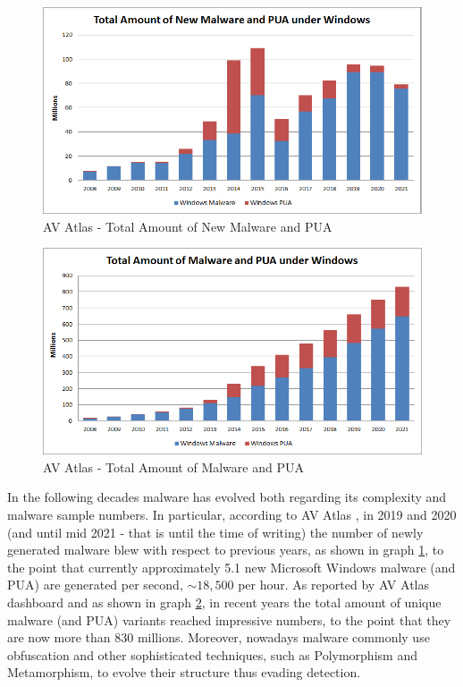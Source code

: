\documentclass[pdfa%
,cucitura%
]{toptesi}
\begin{document}
\begin{figure}[h!]
	\centering
	\includegraphics[width=\textwidth]{./images/av_atlas_report_total_amount_new.png}
	\caption[AV Atlas - Total Amount of New Malware and PUA]{AV Atlas - Total Amount of New Malware and PUA}
	\label{fig:avAtlasReportNew}
\end{figure}

\begin{figure}[h!]
	\centering
	\includegraphics[width=\textwidth]{./images/av_atlas_report_total_amount.png}
	\caption[AV Atlas - Total Amount of Malware and PUA]{AV Atlas - Total Amount of Malware and PUA}
	\label{fig:avAtlasReport}
\end{figure}

In the following decades malware has evolved both regarding its complexity and malware sample numbers. In particular, according to AV Atlas \cite{AvAtlas}, in 2019 and 2020 (and until mid 2021 - that is until the time of writing) the number of newly generated malware blew with respect to previous years, as shown in graph \ref{fig:avAtlasReportNew}, to the point that currently approximately 5.1 new Microsoft Windows malware (and PUA) are generated per second, $\sim18,500$ per hour. As reported by AV Atlas dashboard and as shown in graph \ref{fig:avAtlasReport}, in recent years the total amount of unique malware (and PUA) variants reached impressive numbers, to the point that they are now more than $830$ millions. Moreover, nowadays malware commonly use obfuscation and other sophisticated techniques, such as Polymorphism and Metamorphism, to evolve their structure thus evading detection.
\end{document}
